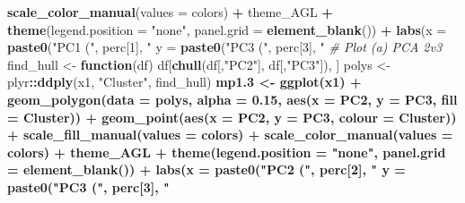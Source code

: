 \documentclass[
]{article}
\newenvironment{Shaded}{\begin{snugshade}}{\end{snugshade}}
\newcommand{\CommentTok}[1]{\textcolor[rgb]{0.56,0.35,0.01}{\textit{#1}}}
\newcommand{\ControlFlowTok}[1]{\textcolor[rgb]{0.13,0.29,0.53}{\textbf{#1}}}
\newcommand{\DataTypeTok}[1]{\textcolor[rgb]{0.13,0.29,0.53}{#1}}
\newcommand{\DecValTok}[1]{\textcolor[rgb]{0.00,0.00,0.81}{#1}}
\newcommand{\FloatTok}[1]{\textcolor[rgb]{0.00,0.00,0.81}{#1}}
\newcommand{\KeywordTok}[1]{\textcolor[rgb]{0.13,0.29,0.53}{\textbf{#1}}}
\newcommand{\NormalTok}[1]{#1}
\newcommand{\OperatorTok}[1]{\textcolor[rgb]{0.81,0.36,0.00}{\textbf{#1}}}
\newcommand{\StringTok}[1]{\textcolor[rgb]{0.31,0.60,0.02}{#1}}
\begin{document}
\begin{Shaded}
\begin{Highlighting}[]
{{{{{{{{{{{{{{{{{\StringTok{  }\KeywordTok{scale_color_manual}\NormalTok{(}\DataTypeTok{values =}\NormalTok{ colors) }\OperatorTok{+}
\StringTok{  }\NormalTok{theme_AGL }\OperatorTok{+}\StringTok{ }
\StringTok{  }\KeywordTok{theme}\NormalTok{(}\DataTypeTok{legend.position =} \StringTok{"none"}\NormalTok{, }\DataTypeTok{panel.grid =} \KeywordTok{element_blank}\NormalTok{()) }\OperatorTok{+}
\StringTok{  }\KeywordTok{labs}\NormalTok{(}\DataTypeTok{x =} \KeywordTok{paste0}\NormalTok{(}\StringTok{"PC1 ("}\NormalTok{, perc[}\DecValTok{1}\NormalTok{], }\StringTok{"%
       \DataTypeTok{y =} \KeywordTok{paste0}\NormalTok{(}\StringTok{"PC3 ("}\NormalTok{, perc[}\DecValTok{3}\NormalTok{], }\StringTok{"%
\CommentTok{# Plot (a) PCA 2v3}
\NormalTok{find_hull <-}\StringTok{ }\ControlFlowTok{function}\NormalTok{(df) df[}\KeywordTok{chull}\NormalTok{(df[,}\StringTok{"PC2"}\NormalTok{], df[,}\StringTok{"PC3"}\NormalTok{]), ]}
\NormalTok{polys <-}\StringTok{ }\NormalTok{plyr}\OperatorTok{::}\KeywordTok{ddply}\NormalTok{(x1, }\StringTok{"Cluster"}\NormalTok{, find_hull) }\OperatorTok{%
\NormalTok{mp1}\FloatTok{.3}\NormalTok{ <-}\StringTok{ }\KeywordTok{ggplot}\NormalTok{(x1) }\OperatorTok{+}
\StringTok{  }\KeywordTok{geom_polygon}\NormalTok{(}\DataTypeTok{data =}\NormalTok{ polys, }\DataTypeTok{alpha =} \FloatTok{0.15}\NormalTok{, }\KeywordTok{aes}\NormalTok{(}\DataTypeTok{x =}\NormalTok{ PC2, }\DataTypeTok{y =}\NormalTok{ PC3, }\DataTypeTok{fill =}\NormalTok{ Cluster)) }\OperatorTok{+}
\StringTok{  }\KeywordTok{geom_point}\NormalTok{(}\KeywordTok{aes}\NormalTok{(}\DataTypeTok{x =}\NormalTok{ PC2, }\DataTypeTok{y =}\NormalTok{ PC3, }\DataTypeTok{colour =}\NormalTok{ Cluster)) }\OperatorTok{+}
\StringTok{  }\KeywordTok{scale_fill_manual}\NormalTok{(}\DataTypeTok{values =}\NormalTok{ colors) }\OperatorTok{+}
\StringTok{  }\KeywordTok{scale_color_manual}\NormalTok{(}\DataTypeTok{values =}\NormalTok{ colors) }\OperatorTok{+}
\StringTok{  }\NormalTok{theme_AGL }\OperatorTok{+}\StringTok{ }
\StringTok{  }\KeywordTok{theme}\NormalTok{(}\DataTypeTok{legend.position =} \StringTok{"none"}\NormalTok{, }\DataTypeTok{panel.grid =} \KeywordTok{element_blank}\NormalTok{()) }\OperatorTok{+}
\StringTok{  }\KeywordTok{labs}\NormalTok{(}\DataTypeTok{x =} \KeywordTok{paste0}\NormalTok{(}\StringTok{"PC2 ("}\NormalTok{, perc[}\DecValTok{2}\NormalTok{], }\StringTok{"%
       \DataTypeTok{y =} \KeywordTok{paste0}\NormalTok{(}\StringTok{"PC3 ("}\NormalTok{, perc[}\DecValTok{3}\NormalTok{], }\StringTok{"%
}}}}}}}}}}}}}}}}}}}}}}
\end{Highlighting}
\end{Shaded}
\end{document}
